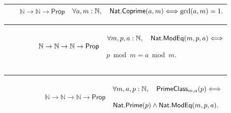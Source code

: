 \documentclass[12pt,reqno]{amsart}
\theoremstyle{blueplain}
\numberwithin{equation}{section}
\begin{document}
{\scriptsize \setlength{\parskip}{0pt}\nointerlineskip
\noindent 
\begin{tabular}{|@{}>{\centering\arraybackslash}m{0.19251\linewidth}|>{\centering\arraybackslash}m{0.16845\linewidth}|>{\centering\arraybackslash}m{0.53904\linewidth}|}
\hline
{\hypertarget{def:Nat.Coprime}{$\mathsf{Nat.Coprime}$}} & {$\mathbb{N}\to%
\mathbb{N}\to\mathsf{Prop}$} & {$\displaystyle \forall a,m:\mathbb{N},\quad 
\hyperlink{def:Nat.Coprime}{\mathsf{Nat.Coprime} }(a,m)\Longleftrightarrow%
\gcd(a,m)=1.$} \\ \hline
\end{tabular}%
}

{\scriptsize \setlength{\parskip}{0pt}\nointerlineskip
\noindent 
\begin{tabular}{|@{}>{\centering\arraybackslash}m{0.19251\linewidth}|>{\centering\arraybackslash}m{0.16845\linewidth}|>{\centering\arraybackslash}m{0.53904\linewidth}|}
\hline
{\hypertarget{def:Nat.ModEq}{$\mathsf{Nat.ModEq}$}} & {$\mathbb{N}\to\mathbb{%
N}\to\mathbb{N}\to\mathsf{Prop}$} & {$\displaystyle \forall m,p,a:\mathbb{N}%
,\quad \hyperlink{def:Nat.ModEq}{\mathsf{Nat.ModEq} }(m,p,a)%
\Longleftrightarrow$ \par$\displaystyle p\bmod m=a\bmod m.$} \\ \hline
\end{tabular}%
}

{\scriptsize \setlength{\parskip}{0pt}\nointerlineskip
\noindent 
\begin{tabular}{|@{}>{\centering\arraybackslash}m{0.19251\linewidth}|>{\centering\arraybackslash}m{0.16845\linewidth}|>{\centering\arraybackslash}m{0.53904\linewidth}|}
\hline
{\hypertarget{def:PrimeClass}{$\mathsf{PrimeClass}$}} & {$\mathbb{N}\to%
\mathbb{N}\to\mathbb{N}\to\mathsf{Prop}$} & {$\displaystyle \forall m,a,p:%
\mathbb{N},\quad \hyperlink{def:PrimeClass}{\mathsf{PrimeClass} }%
_{m,a}(p)\Longleftrightarrow$ \par$\displaystyle \hyperlink{def:Nat.Prime}{%
\mathsf{Nat.Prime} }(p)\wedge \hyperlink{def:Nat.ModEq}{\mathsf{Nat.ModEq} }%
(m,p,a).$} \\ \hline
\end{tabular}%
}
\end{document}
